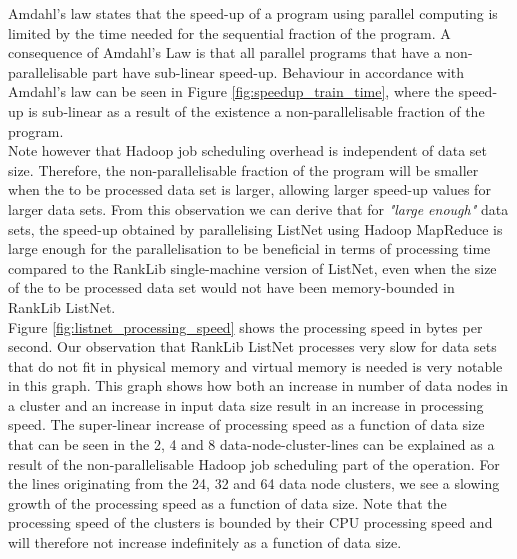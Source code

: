 Amdahl's law states that the speed-up of a program using parallel computing is limited by the time needed for the sequential fraction of the program. A consequence of Amdahl's Law is that all parallel programs that have a non-parallelisable part have sub-linear speed-up. Behaviour in accordance with Amdahl's law can be seen in Figure \ref{fig:speedup_train_time}, where the speed-up is sub-linear as a result of the existence a non-parallelisable fraction of the program.\\

Note however that Hadoop job scheduling overhead is independent of data set size. Therefore, the non-parallelisable fraction of the program will be smaller when the to be processed data set is larger, allowing larger speed-up values for larger data sets. From this observation we can derive that for \emph{"large enough"} data sets, the speed-up obtained by parallelising ListNet using Hadoop MapReduce is large enough for the parallelisation to be beneficial in terms of processing time compared to the RankLib single-machine version of ListNet, even when the size of the to be processed data set would not have been memory-bounded in RankLib ListNet.\\

Figure \ref{fig:listnet_processing_speed} shows the processing speed in bytes per second. Our observation that RankLib ListNet processes very slow for data sets that do not fit in physical memory and virtual memory is needed is very notable in this graph. This graph shows how both an increase in number of data nodes in a cluster and an increase in input data size result in an increase in processing speed. The super-linear increase of processing speed as a function of data size that can be seen in the 2, 4 and 8 data-node-cluster-lines can be explained as a result of the non-parallelisable Hadoop job scheduling part of the operation. For the lines originating from the 24, 32 and 64 data node clusters, we see a slowing growth of the processing speed as a function of data size. Note that the processing speed of the clusters is bounded by their CPU processing speed and will therefore not increase indefinitely as a function of data size.\\

